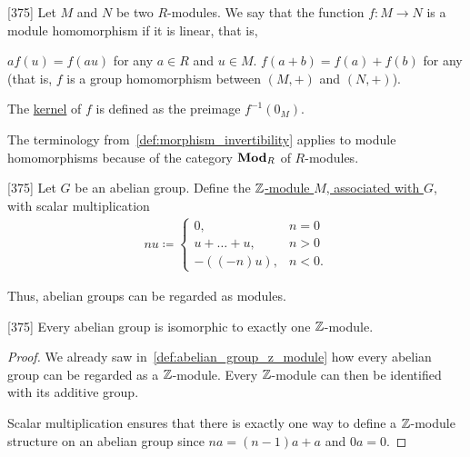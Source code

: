 \begin{definition}\label{def:module_homomorphism}\cite{Knapp2016BAlg}[375]
  Let $M$ and $N$ be two $R$-modules. We say that the function $f: M \to N$ is a module homomorphism if it is linear, that is,
  \begin{description}
     $a f(u) = f(a u)$ for any $a \in R$ and $u \in M$.
     $f(a + b) = f(a) + f(b)$ for any (that is, $f$ is a group homomorphism between $(M, +)$ and $(N, +)$).
  \end{description}

  The \uline{kernel} of $f$ is defined as the preimage $f^{-1}(0_M)$.

  The terminology from~\cref{def:morphism_invertibility} applies to module homomorphisms because of the category $\operatorname{\mathbf{Mod}}_R$ of $R$-modules.
\end{definition}

\begin{definition}\label{def:abelian_group_z_module}\cite{Knapp2016BAlg}[375]
  Let $G$ be an abelian group. Define the \uline{$\mathbb Z$-module $M$, associated with $G$}, with scalar multiplication
  \begin{align*}
    nu \coloneqq \begin{cases}
      0, &n = 0 \\
      u + \ldots + u, &n > 0 \\
      -((-n)u), &n < 0.
    \end{cases}
  \end{align*}

  Thus, abelian groups can be regarded as modules.
\end{definition}

\begin{theorem}\label{thm:abelian_group_iff_z_module}\cite{Knapp2016BAlg}[375]
  Every abelian group is isomorphic to exactly one $\mathbb Z$-module.
\end{theorem}
\begin{proof}
  We already saw in~\cref{def:abelian_group_z_module} how every abelian group can be regarded as a $\mathbb Z$-module. Every $\mathbb Z$-module can then be identified with its additive group.

  Scalar multiplication ensures that there is exactly one way to define a $\mathbb Z$-module structure on an abelian group since $na = (n-1)a + a$ and $0a = 0$.
\end{proof}

